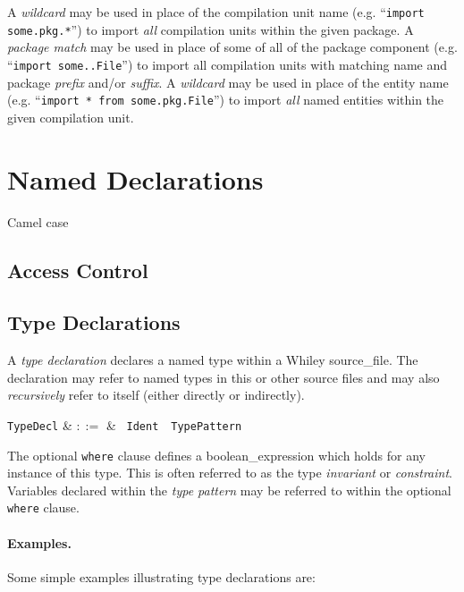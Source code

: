 A {\em wildcard} may be used in place of the compilation unit name (e.g. ``\lstinline{import some.pkg.*}'') to import {\em all} compilation units within the given package.  A {\em package match} may be used in place of some of all of the package component (e.g. ``\lstinline{import some..File}'') to import all compilation units with matching name and package {\em prefix} and/or {\em suffix}.  A {\em wildcard} may be used in place of the entity name (e.g. ``\lstinline{import * from some.pkg.File}'') to import {\em all} named entities within the given compilation unit.  

\section{Named Declarations}

Camel case

\subsection{Access Control}


\subsection{Type Declarations}
\label{c_source_files_type_decl}

A {\em type declaration} declares a named type within a Whiley \gls{source_file}.  The declaration may refer to named types in this or other source files and may also {\em recursively} refer to itself (either directly or indirectly).

\begin{syntax}
  \verb+TypeDecl+ & $::=$ & \ \verb+Ident+\ \
  \verb+TypePattern+\ \\
\end{syntax}

The optional \lstinline{where} clause defines a
\gls{boolean_expression} which holds for any instance of this type.
This is often referred to as the type {\em invariant} or {\em
  constraint}.  Variables declared within the {\em type pattern} may be
referred to within the optional \lstinline{where} clause.

\paragraph{Examples.}  Some simple examples illustrating type
declarations are:

